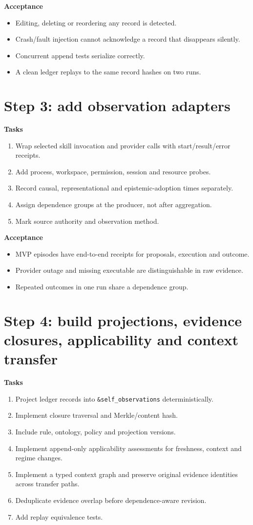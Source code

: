 \documentclass[11pt,oneside]{report}
\begin{document}
\textbf{Acceptance}
\begin{itemize}
  \item Editing, deleting or reordering any record is detected.
  \item Crash/fault injection cannot acknowledge a record that disappears silently.
  \item Concurrent append tests serialize correctly.
  \item A clean ledger replays to the same record hashes on two runs.
\end{itemize}

\section{Step 3: add observation adapters}

\textbf{Tasks}
\begin{enumerate}
  \item Wrap selected skill invocation and provider calls with start/result/error receipts.
  \item Add process, workspace, permission, session and resource probes.
  \item Record causal, representational and epistemic-adoption times separately.
  \item Assign dependence groups at the producer, not after aggregation.
  \item Mark source authority and observation method.
\end{enumerate}

\textbf{Acceptance}
\begin{itemize}
  \item MVP episodes have end-to-end receipts for proposals, execution and outcome.
  \item Provider outage and missing executable are distinguishable in raw evidence.
  \item Repeated outcomes in one run share a dependence group.
\end{itemize}

\section{Step 4: build projections, evidence closures, applicability and context transfer}

\textbf{Tasks}
\begin{enumerate}
  \item Project ledger records into \texttt{\&self\_observations} deterministically.
  \item Implement closure traversal and Merkle/content hash.
  \item Include rule, ontology, policy and projection versions.
  \item Implement append-only applicability assessments for freshness, context and regime changes.
  \item Implement a typed context graph and preserve original evidence identities across transfer paths.
  \item Deduplicate evidence overlap before dependence-aware revision.
  \item Add replay equivalence tests.
\end{enumerate}
\end{document}
